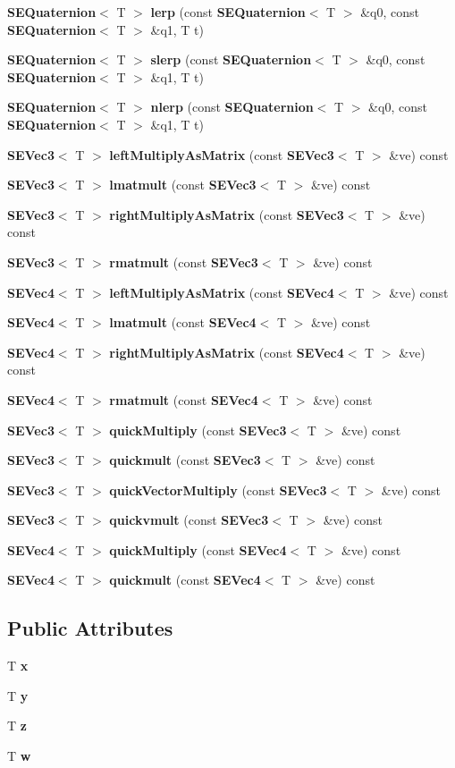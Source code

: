 \begin{DoxyCompactItemize}
{\bf S\+E\+Quaternion}$<$ T $>$ {\bf lerp} (const {\bf S\+E\+Quaternion}$<$ T $>$ \&q0, const {\bf S\+E\+Quaternion}$<$ T $>$ \&q1, T t)
\item 
{\bf S\+E\+Quaternion}$<$ T $>$ {\bf slerp} (const {\bf S\+E\+Quaternion}$<$ T $>$ \&q0, const {\bf S\+E\+Quaternion}$<$ T $>$ \&q1, T t)
\item 
{\bf S\+E\+Quaternion}$<$ T $>$ {\bf nlerp} (const {\bf S\+E\+Quaternion}$<$ T $>$ \&q0, const {\bf S\+E\+Quaternion}$<$ T $>$ \&q1, T t)
\item 
{\bf S\+E\+Vec3}$<$ T $>$ {\bf left\+Multiply\+As\+Matrix} (const {\bf S\+E\+Vec3}$<$ T $>$ \&ve) const 
\item 
{\bf S\+E\+Vec3}$<$ T $>$ {\bf lmatmult} (const {\bf S\+E\+Vec3}$<$ T $>$ \&ve) const 
\item 
{\bf S\+E\+Vec3}$<$ T $>$ {\bf right\+Multiply\+As\+Matrix} (const {\bf S\+E\+Vec3}$<$ T $>$ \&ve) const 
\item 
{\bf S\+E\+Vec3}$<$ T $>$ {\bf rmatmult} (const {\bf S\+E\+Vec3}$<$ T $>$ \&ve) const 
\item 
{\bf S\+E\+Vec4}$<$ T $>$ {\bf left\+Multiply\+As\+Matrix} (const {\bf S\+E\+Vec4}$<$ T $>$ \&ve) const 
\item 
{\bf S\+E\+Vec4}$<$ T $>$ {\bf lmatmult} (const {\bf S\+E\+Vec4}$<$ T $>$ \&ve) const 
\item 
{\bf S\+E\+Vec4}$<$ T $>$ {\bf right\+Multiply\+As\+Matrix} (const {\bf S\+E\+Vec4}$<$ T $>$ \&ve) const 
\item 
{\bf S\+E\+Vec4}$<$ T $>$ {\bf rmatmult} (const {\bf S\+E\+Vec4}$<$ T $>$ \&ve) const 
\item 
{\bf S\+E\+Vec3}$<$ T $>$ {\bf quick\+Multiply} (const {\bf S\+E\+Vec3}$<$ T $>$ \&ve) const 
\item 
{\bf S\+E\+Vec3}$<$ T $>$ {\bf quickmult} (const {\bf S\+E\+Vec3}$<$ T $>$ \&ve) const 
\item 
{\bf S\+E\+Vec3}$<$ T $>$ {\bf quick\+Vector\+Multiply} (const {\bf S\+E\+Vec3}$<$ T $>$ \&ve) const 
\item 
{\bf S\+E\+Vec3}$<$ T $>$ {\bf quickvmult} (const {\bf S\+E\+Vec3}$<$ T $>$ \&ve) const 
\item 
{\bf S\+E\+Vec4}$<$ T $>$ {\bf quick\+Multiply} (const {\bf S\+E\+Vec4}$<$ T $>$ \&ve) const 
\item 
{\bf S\+E\+Vec4}$<$ T $>$ {\bf quickmult} (const {\bf S\+E\+Vec4}$<$ T $>$ \&ve) const 
\end{DoxyCompactItemize}
\subsection*{Public Attributes}
\begin{DoxyCompactItemize}
\item 
T {\bf x}
\item 
T {\bf y}
\item 
T {\bf z}
\item 
T {\bf w}
\end{DoxyCompactItemize}
